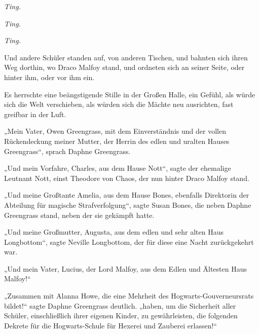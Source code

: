 \emph{Ting.}

\emph{Ting.}

\emph{Ting.}

Und andere Schüler standen auf, von anderen Tischen, und bahnten sich ihren Weg dorthin, wo Draco Malfoy stand, und ordneten sich an seiner Seite, oder hinter ihm, oder vor ihm ein.

Es herrschte eine beängstigende Stille in der Großen Halle, ein Gefühl, als würde sich die Welt verschieben, als würden sich die Mächte neu ausrichten, fast greifbar in der Luft.

„Mein Vater, Owen Greengrass, mit dem Einverständnis und der vollen Rückendeckung meiner Mutter, der Herrin des edlen und uralten Hauses Greengrass“, sprach Daphne Greengrass.

„Und mein Vorfahre, Charles, aus dem Hause Nott“, sagte der ehemalige Leutnant Nott, einst Theodore von Chaos, der nun hinter Draco Malfoy stand.

„Und meine Großtante Amelia, aus dem Hause Bones, ebenfalls Direktorin der Abteilung für magische Strafverfolgung“, sagte Susan Bones, die neben Daphne Greengrass stand, neben der sie gekämpft hatte.

„Und meine Großmutter, Augusta, aus dem edlen und sehr alten Haus Longbottom“, sagte Neville Longbottom, der für diese eine Nacht zurückgekehrt war.

„Und mein Vater, Lucius, der Lord Malfoy, aus dem Edlen und Ältesten Haus Malfoy!“

„Zusammen mit Alanna Howe, die eine Mehrheit des Hogwarts-Gouverneursrats bildet!“ sagte Daphne Greengrass deutlich. „haben, um die Sicherheit aller Schüler, einschließlich ihrer eigenen Kinder, zu gewährleisten, die folgenden Dekrete für die Hogwarts-Schule für Hexerei und Zauberei erlassen!“

